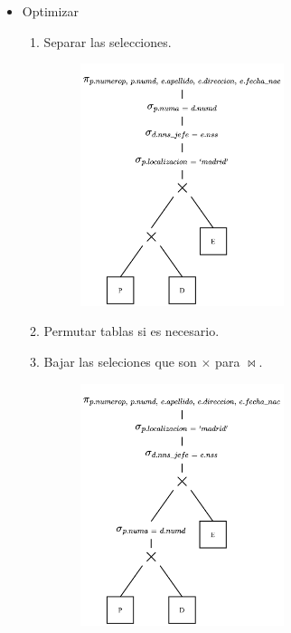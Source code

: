 \documentclass{templateNote}
\begin{document}
\begin{enumerate}
    \begin{itemize}
        \item Optimizar
        \begin{enumerate}
            \item Separar las selecciones.
            \begin{figure}[H]
                \centering
                \includegraphics[width=0.6\textwidth]{img/E4-Paso-1.png}
            \end{figure}

            \newpage
            \item Permutar tablas si es necesario.

            \item Bajar las seleciones que son $\times$ para $\Join$.
            \begin{figure}[H]
                \centering
                \includegraphics[width=0.6\textwidth]{img/E4-Paso-3.png}
            \end{figure}


\end{enumerate}
\end{itemize}
\end{enumerate}
\end{document}
